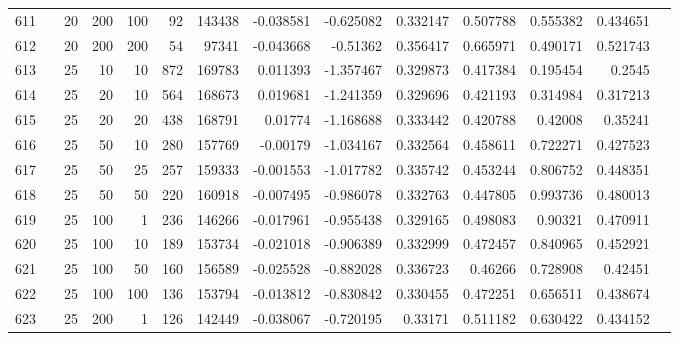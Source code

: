 \begin{longtable}{llrrrrrrrrrrrr}
		611 & &           20 &               200 &          100 &          92 &     143438 & -0.038581 & -0.625082 &  0.332147 &    0.507788 &       0.555382 &  0.434651 \\
		612 & &           20 &               200 &          200 &          54 &      97341 & -0.043668 &  -0.51362 &  0.356417 &    0.665971 &       0.490171 &  0.521743 \\
		613 & &           25 &                10 &           10 &         872 &     169783 &  0.011393 & -1.357467 &  0.329873 &    0.417384 &       0.195454 &    0.2545 \\
		614 & &           25 &                20 &           10 &         564 &     168673 &  0.019681 & -1.241359 &  0.329696 &    0.421193 &       0.314984 &  0.317213 \\
		615 & &           25 &                20 &           20 &         438 &     168791 &   0.01774 & -1.168688 &  0.333442 &    0.420788 &        0.42008 &   0.35241 \\
		616 & &           25 &                50 &           10 &         280 &     157769 &  -0.00179 & -1.034167 &  0.332564 &    0.458611 &       0.722271 &  0.427523 \\
		617 & &           25 &                50 &           25 &         257 &     159333 & -0.001553 & -1.017782 &  0.335742 &    0.453244 &       0.806752 &  0.448351 \\
		618 & &           25 &                50 &           50 &         220 &     160918 & -0.007495 & -0.986078 &  0.332763 &    0.447805 &       0.993736 &  0.480013 \\
		619 & &           25 &               100 &            1 &         236 &     146266 & -0.017961 & -0.955438 &  0.329165 &    0.498083 &        0.90321 &  0.470911 \\
		620 & &           25 &               100 &           10 &         189 &     153734 & -0.021018 & -0.906389 &  0.332999 &    0.472457 &       0.840965 &  0.452921 \\
		621 & &           25 &               100 &           50 &         160 &     156589 & -0.025528 & -0.882028 &  0.336723 &     0.46266 &       0.728908 &   0.42451 \\
		622 & &           25 &               100 &          100 &         136 &     153794 & -0.013812 & -0.830842 &  0.330455 &    0.472251 &       0.656511 &  0.438674 \\
		623 & &           25 &               200 &            1 &         126 &     142449 & -0.038067 & -0.720195 &   0.33171 &    0.511182 &       0.630422 &  0.434152 \\

\end{longtable}
